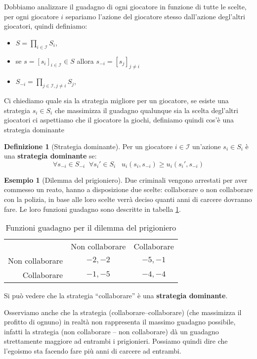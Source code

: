 \documentclass[a4paper]{article}
\theoremstyle{plain}
\theoremstyle{definition}
\newtheorem{mydef}[myteo]{Definizione}
\newtheorem{myes}[myteo]{Esempio}
\theoremstyle{remark}
\newcommand{\pa}[1]{\left(#1\right)}
\newcommand{\bra}[1]{\left[#1\right]}
\begin{document}
Dobbiamo analizzare il guadagno di ogni giocatore in funzione di tutte
le scelte, per ogni giocatore $i$ separiamo l'azione del giocatore
stesso dall'azione degl'altri giocatori, quindi definiamo:
\begin{itemize}
\item $S = \prod _{i\in\mathcal{I}} S_i$,
\item se $s = \bra{s_i}_{i\in\mathcal{I}} \in S$ allora $s_{-i} =
  \bra{s_j}_{j\neq i}$
\item $\displaystyle S_{-i} = \prod _{j\in\mathcal{I},j\neq i} S_j$,
\end{itemize}

Ci chiediamo quale sia la strategia migliore per un giocatore, se
esiste una strategia $s_i\in S_i$ che massimizza il guadagno qualunque
sia la scelta degl'altri giocatori ci aspettiamo che il giocatore la
giochi, definiamo quindi cos'è una strategia dominante

\begin{mydef}[Strategia dominante]
  Per un giocatore $i\in\mathcal{I}$ un'azione $s_i\in S_i$ è una
  \textbf{strategia dominante} se:
  \[ \forall s_{-i} \in S_{-i}\;\; \forall s_i' \in S_i\;\;\;
    u_i\pa{s_i,s_{-i}} \ge u_i\pa{s_i',s_{-i}} \]
\end{mydef}

\begin{myes}[Dilemma del prigioniero]
  Due criminali vengono arrestati per aver commesso un reato, hanno a
  disposizione due scelte: collaborare o non collaborare con la
  polizia, in base alle loro scelte verrà deciso quanti anni di
  carcere dovranno fare. Le loro funzioni guadagno sono descritte in
  tabella \ref{tab:u1u2-prigioniero}.
  
  \begin{table}[!ht]
    \centering
    \begin{tabular}{rcc}
      & Non collaborare & Collaborare \\
      \cline{2-3}
      Non collaborare & \multicolumn{1}{|c|}{$-2,-2$} & \multicolumn{1}{|c|}{$-5,-1$}  \\
      \cline{2-3}
      Collaborare & \multicolumn{1}{|c|}{$-1,-5$} & \multicolumn{1}{|c|}{$-4,-4$}  \\
      \cline{2-3}
    \end{tabular}
    \caption{Funzioni guadagno per il dilemma del prigioniero}
    \label{tab:u1u2-prigioniero}
  \end{table}
  
  Si può vedere che la strategia ``collaborare'' è una
  \textbf{strategia dominante}.

  Osserviamo anche che la strategia (collaborare--collaborare) (che
  massimizza il profitto di ognuno) in realtà non rappresenta il
  massimo guadagno possibile, infatti la strategia (non collaborare --
  non collaborare) dà un guadagno strettamente maggiore ad entrambi i
  prigionieri. Possiamo quindi dire che l'egoismo sta facendo fare più
  anni di carcere ad entrambi.
\end{myes}
\end{document}
